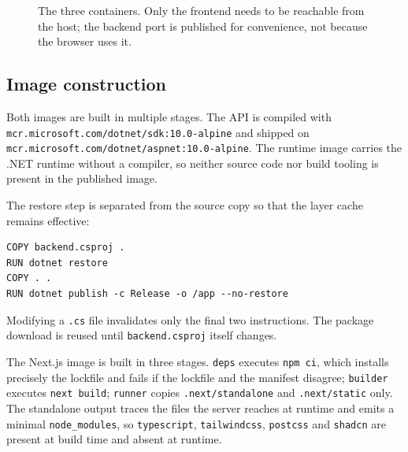 \documentclass[11pt,a4paper]{article}
\newcommand{\code}[1]{\texttt{\fontsize{8.6}{10}\selectfont #1}}
\newcommand{\brk}{\discretionary{}{}{}}
\newcommand{\sub}[1]{{\fontsize{6.2}{7.2}\selectfont #1}}
\begin{document}
\begin{figure}[H]
\caption{The three containers. Only the frontend needs to be reachable from the
host; the backend port is published for convenience, not because the browser
uses it.}
\label{fig:docker}
\end{figure}

\subsection{Image construction}

Both images are built in multiple stages. The API is compiled with
\code{mcr.microsoft.com\brk/dotnet\brk/sdk:10.0-alpine} and shipped on
\code{mcr.microsoft.com\brk/dotnet\brk/aspnet:10.0-alpine}. The runtime image carries
the .NET runtime without a compiler, so neither source code nor build tooling
is present in the published image.

The restore step is separated from the source copy so that the layer cache
remains effective:

\begin{lstlisting}
COPY backend.csproj .
RUN dotnet restore
COPY . .
RUN dotnet publish -c Release -o /app --no-restore
\end{lstlisting}

Modifying a \code{.cs} file invalidates only the final two instructions. The
package download is reused until \code{backend.csproj} itself changes.

The Next.js image is built in three stages. \code{deps} executes \code{npm ci},
which installs precisely the lockfile and fails if the lockfile and the manifest
disagree; \code{builder} executes \code{next build}; \code{runner} copies
\code{.next/standalone} and \code{.next/static} only. The standalone output
traces the files the server reaches at runtime and emits a minimal
\code{node\_modules}, so \code{typescript}, \code{tailwindcss}, \code{postcss}
and \code{shadcn} are present at build time and absent at runtime.
\end{document}
